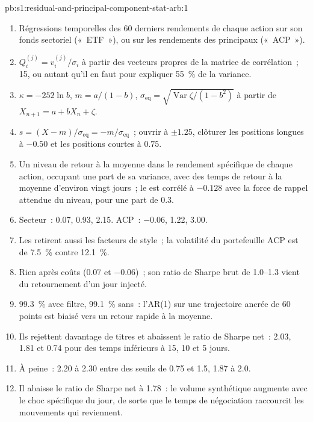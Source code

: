 \begin{solution}{pb:s1:residual-and-principal-component-stat-arb:1}
\begin{enumerate}
\item Régressions temporelles des 60 derniers rendements de chaque action sur son fonds sectoriel («~ETF~»), ou sur les rendements des principaux  («~ACP~»).
\item $Q^{(j)}_i = v^{(j)}_i/\sigma_i$ à partir des vecteurs propres de la matrice de corrélation~; 15, ou autant qu'il en faut pour expliquer 55~\% de la variance.
\item $\kappa = -252 \ln b$, $m = a/(1-b)$, $\sigma_{\mathrm{eq}} = \sqrt{\operatorname{Var}\zeta/(1-b^2)}$ à partir de $X_{n+1} = a + bX_n + \zeta$.
\item $s = (X - m)/\sigma_{\mathrm{eq}} = -m/\sigma_{\mathrm{eq}}$~; ouvrir à $\pm 1.25$, clôturer les positions longues à $-0.50$ et les positions courtes à $0.75$.
\item Un niveau de retour à la moyenne dans le rendement spécifique de chaque action, occupant une part de sa variance, avec des temps de retour à la moyenne d'environ vingt jours~; le  est corrélé
à $-0.128$ avec la force de rappel attendue du niveau, pour une part de 0.3.
\item Secteur~: 0.07, 0.93, 2.15. ACP~: $-0.06$, 1.22, 3.00.
\item Les  retirent aussi les facteurs de style~; la volatilité du portefeuille ACP est de 7.5~\% contre 12.1~\%.
\item Rien après coûts (0.07 et $-0.06$)~; son ratio de Sharpe brut de 1.0--1.3 vient du retournement d'un jour injecté.
\item 99.3~\% avec filtre, 99.1~\% sans~: l'AR(1) sur une trajectoire ancrée de 60 points est biaisé vers un retour rapide à la moyenne.
\item Ils rejettent davantage de titres et abaissent le ratio de Sharpe net~: 2.03, 1.81 et 0.74 pour des temps inférieurs à 15, 10 et 5 jours.
\item À peine~: 2.20 à 2.30 entre des seuils de 0.75 et 1.5, 1.87 à 2.0.
\item Il abaisse le ratio de Sharpe net à 1.78~: le volume synthétique augmente avec le choc spécifique du jour, de sorte que le temps de négociation raccourcit les mouvements qui reviennent.

\end{enumerate}
\end{solution}
